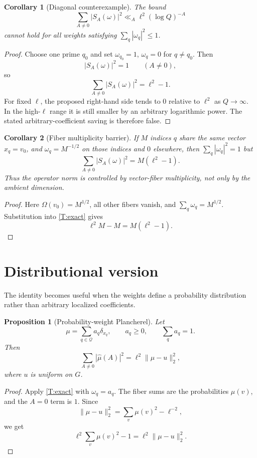 \documentclass[11pt]{article}
\newtheorem{proposition}{Proposition}
\newtheorem{corollary}{Corollary}
\begin{document}
\begin{corollary}[Diagonal counterexample]\label{C:single}
The bound
\[
\sum_{A\ne0}|S_A(\omega)|^2
\ll_A
\ell^2(\log Q)^{-A}
\]
cannot hold for all weights satisfying \(\sum_q|\omega_q|^2\le1\).
\end{corollary}

\begin{proof}
Choose one prime \(q_0\) and set \(\omega_{q_0}=1\), \(\omega_q=0\) for \(q\ne q_0\).  Then
\[
|S_A(\omega)|^2=1
\qquad(A\ne0),
\]
so
\[
\sum_{A\ne0}|S_A(\omega)|^2=\ell^2-1.
\]
For fixed \(\ell\), the proposed right-hand side tends to \(0\) relative to \(\ell^2\) as \(Q\to\infty\).  In the high-\(\ell\) range it is still smaller by an arbitrary logarithmic power.  The stated arbitrary-coefficient saving is therefore false.
\end{proof}

\begin{corollary}[Fiber multiplicity barrier]\label{C:fiber}
If \(M\) indices \(q\) share the same vector \(x_q=v_0\), and \(\omega_q=M^{-1/2}\) on those indices and \(0\) elsewhere, then \(\sum_q|\omega_q|^2=1\) but
\[
\sum_{A\ne0}|S_A(\omega)|^2
=
M(\ell^2-1).
\]
Thus the operator norm is controlled by vector-fiber multiplicity, not only by the ambient dimension.
\end{corollary}

\begin{proof}
Here \(\Omega(v_0)=M^{1/2}\), all other fibers vanish, and \(\sum_q\omega_q=M^{1/2}\).  Substitution into \cref{T:exact} gives
\[
\ell^2M-M=M(\ell^2-1).
\]
\end{proof}

\section{Distributional version}

The identity becomes useful when the weights define a probability distribution rather than arbitrary localized coefficients.

\begin{proposition}[Probability-weight Plancherel]\label{P:prob}
Let
\[
\mu=\sum_{q\in\mathcal Q}a_q\delta_{x_q},
\qquad a_q\ge0,\qquad \sum_q a_q=1.
\]
Then
\[
\sum_{A\ne0}|\widehat\mu(A)|^2
=
\ell^2\|\mu-u\|_2^2,
\]
where \(u\) is uniform on \(G\).
\end{proposition}

\begin{proof}
Apply \cref{T:exact} with \(\omega_q=a_q\).  The fiber sums are the probabilities \(\mu(v)\), and the \(A=0\) term is \(1\).  Since
\[
\|\mu-u\|_2^2
=
\sum_v\mu(v)^2-\ell^{-2},
\]
we get
\[
\ell^2\sum_v\mu(v)^2-1
=
\ell^2\|\mu-u\|_2^2.
\]
\end{proof}
\end{document}
